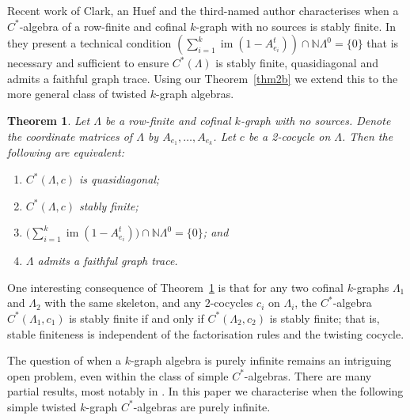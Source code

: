 \documentclass[a4paper, 12pt]{amsart}
\numberwithin{equation}{section}
\newcounter{theorem}
\newtheorem{thm}[theorem]{Theorem}
\theoremstyle{remark}
\theoremstyle{definition}
\begin{document}
Recent work \cite{MR3507995} of Clark, an Huef and the third-named author characterises
when a $C^*$-algebra of a row-finite and cofinal $k$-graph with no sources is stably
finite. In \cite[Theorem~1.1.(1)(c)]{MR3507995} they present a technical condition
$(\sum_{i=1}^k{\operatorname{im}}(1-A^t_{e_i})) \cap {\mathbb{N}}{\Lambda^0} = \{0\}$ that is necessary and
sufficient to ensure $C^*(\Lambda)$ is stably finite, quasidiagonal and admits a faithful
graph trace. Using our Theorem~\ref{thm2b} we extend this to the more general class of
twisted $k$-graph algebras.

\begin{thm}\label{thm.stably.finite}
Let $\Lambda$ be a row-finite and cofinal $k$-graph with no sources. Denote the
coordinate matrices of $\Lambda$ by $A_{e_1}, \dots , A_{e_k}$. Let $c$ be a 2-cocycle on
$\Lambda$. Then the following are equivalent:
\begin{enumerate}
\item\label{thm.stably.finite.(a)} $C^*(\Lambda,c)$ is quasidiagonal;
\item\label{thm.stably.finite.(b)} $C^*(\Lambda,c)$ stably finite;
\item\label{thm.stably.finite.(c)} $\big(\sum_{i=1}^k{\operatorname{im}}(1-A^t_{e_i}) \big) \cap {\mathbb{N}}{\Lambda^0} = \{0\}$; and
\item\label{thm.stably.finite.(d)} $\Lambda$ admits a faithful graph trace.
\end{enumerate}
\end{thm}

One interesting consequence of Theorem~\ref{thm.stably.finite} is that for any two
cofinal $k$-graphs $\Lambda_1$ and $\Lambda_2$ with the same skeleton, and any $2$-cocycles $c_i$
on $\Lambda_i$, the $C^*$-algebra $C^*(\Lambda_1, c_1)$ is stably finite if and only if
$C^*(\Lambda_2, c_2)$ is stably finite; that is, stable finiteness is independent of the
factorisation rules and the twisting cocycle.

The question of when a $k$-graph algebra is purely infinite remains an intriguing open
problem, even within the class of simple $C^*$-algebras. There are many partial results, most
notably in \cite{MR2920846, BroClaSie}. In this paper we characterise when the following simple
twisted $k$-graph $C^*$-algebras are purely infinite.
\end{document}
